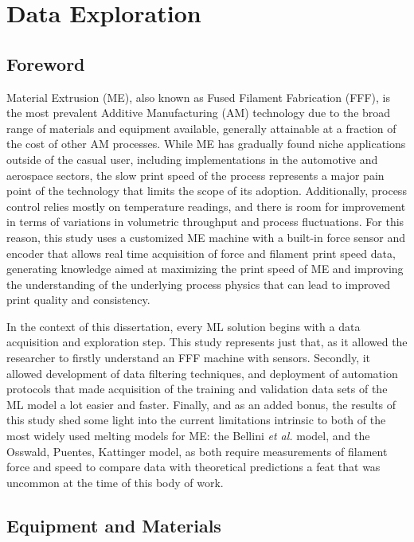 \documentclass[main.tex]{subfiles}
\begin{document}
\chapter{Data Exploration} \label{ch:data_ex}
\section{Foreword} \label{sec:fw_dataex}

Material Extrusion (ME), also known as Fused Filament Fabrication (FFF), is the most prevalent Additive Manufacturing (AM) technology due to the broad range of materials and equipment available, generally attainable at a fraction of the cost of other AM processes. While ME has gradually found niche applications outside of the casual user, including implementations in the automotive and aerospace sectors, the slow print speed of the process represents a major pain point of the technology that limits the scope of its adoption. Additionally, process control relies mostly on temperature readings, and there is room for improvement in terms of variations in volumetric throughput and process fluctuations. For this reason, this study uses a customized ME machine with a built-in force sensor and encoder that allows real time acquisition of force and filament print speed data, generating knowledge aimed at maximizing the print speed of ME and improving the understanding of the underlying process physics that can lead to improved print quality and consistency. 

In the context of this dissertation, every ML solution begins with a data acquisition and exploration step. This study represents just that, as it allowed the researcher to firstly understand an FFF machine with sensors. Secondly, it allowed development of data filtering techniques, and deployment of automation protocols that made acquisition of the training and validation data sets of the ML model a lot easier and faster. Finally, and as an added bonus, the results of this study shed some light into the current limitations intrinsic to both of the most widely used melting models for ME: the Bellini \emph{et al.} model, and the Osswald, Puentes, Kattinger model, as both require measurements of filament force and speed to compare data with theoretical predictions \textemdash a feat that was uncommon at the time of this body of work.

\section{Equipment and Materials} \label{ssec:mat_data}
\end{document}
